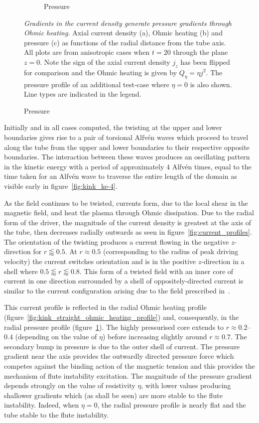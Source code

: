 \documentclass[fleqn,usenatbib]{mnras}
\newcommand{\mycaption}[2]{\caption[#1]{\emph{#1} #2}}
\begin{document}
\begin{figure}
\begin{subfigure}{0.32\textwidth}
      \caption{Pressure}
      \label{fig:pressure_profiles}
    \end{subfigure}
  \mycaption{
  Gradients in the current density generate pressure gradients through Ohmic
  heating.}{Axial current density (a), Ohmic heating (b) and pressure (c) as
  functions of the radial distance from the tube axis. All plots are from
  anisotropic cases when $t=20$ through the plane $z=0$. Note the sign of the
  axial current density $j_z$ has been flipped for comparison and the Ohmic
  heating is given by $Q_{\eta} = \eta j^2$. The pressure profile of an
  additional test-case where $\eta=0$ is also shown. Line types are indicated
  in the legend.}%
  \label{fig:pressure_and_heating}
\end{figure}

Initially and in all cases computed, the
twisting at the upper and lower boundaries gives rise to a pair of
torsional Alfv\'en waves which proceed to travel along the tube
from the upper and lower boundaries to their respective
opposite boundaries. The interaction between these waves produces an 
oscillating pattern in the kinetic energy with a period of
approximately $4$ Alfv\'en times, equal to the time taken for an
Alfv\'en wave to traverse the entire length of the domain
as visible early in figure~\ref{fig:kink_ke-4}. 

As the field continues to be twisted, currents form, due to the local
shear in the magnetic field, and heat the plasma through Ohmic
dissipation. Due to the radial form of the driver, the magnitude of the
current density is greatest at the axis of the tube, then decreases
radially outwards as seen in figure~\ref{fig:current_profiles}. The orientation
of the twisting produces a current flowing in the negative
$z$-direction for $r\lessapprox0.5$. At $r \approx 0.5$ (corresponding
to the radius of peak driving velocity) the current switches orientation
and is in the positive $z$-direction in a shell where $0.5\lessapprox
r \lessapprox 0.8$. This form of a twisted field with an inner core of
current in one direction surrounded by a shell of
oppositely-directed current is similar to the current configuration arising due to the field prescribed in~\citet{quinnEffectAnisotropicViscosity2020}. 

This current profile is reflected in the radial Ohmic heating profile
(figure~\ref{fig:kink_straight_ohmic_heating_profile}) and,
consequently, in the radial pressure profile
(figure~\ref{fig:pressure_profiles}). The highly pressurised core
extends to $r\approx 0.2$--$0.4$ (depending on the value of $\eta$)
before increasing slightly around $r\approx 0.7$. The secondary bump
in pressure is due to the outer shell of current. The pressure
gradient near the axis provides the outwardly directed pressure force
which competes against the binding action of the magnetic tension
and this provides the mechanism of
flute instability excitation.  The magnitude
of the pressure gradient depends strongly on the value of
resistivity $\eta$, with lower values producing shallower 
gradients which (as shall be seen) are more stable to the
flute instability. Indeed, when $\eta=0$, the radial
pressure profile is nearly flat and the tube stable to the
flute instability.
\end{document}
